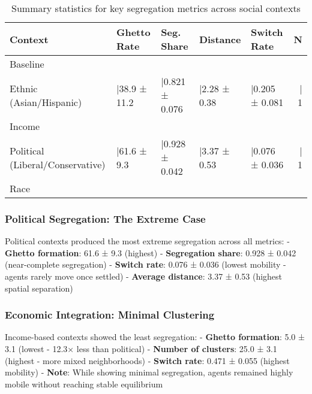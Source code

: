\documentclass[
  11pt,
]{article}
\begin{document}
\begin{longtable}[t]{lllllr}
\caption{Summary statistics for key segregation metrics across social contexts}\tabularnewline

\toprule
Context & Ghetto Rate & Seg. Share & Distance & Switch Rate & N\\
\midrule
Baseline
\cellcolor{gray!10}{(Red/Blue)} & \cellcolor{gray!10}{|19.5 ± 9.6} & \cellcolor{gray!10}{|0.679 ± 0.072} & \cellcolor{gray!10}{|1.59 ± 0.28} & \cellcolor{gray!10}{|0.363 ± 0.078} & \cellcolor{gray!10}{| 10}\\
Ethnic
(Asian/Hispanic) & |38.9 ± 11.2 & |0.821 ± 0.076 & |2.28 ± 0.38 & |0.205 ± 0.081 & |  1\\
Income
\cellcolor{gray!10}{(High/Low)} & \cellcolor{gray!10}{|5.0 ± 3.1} & \cellcolor{gray!10}{|0.543 ± 0.034} & \cellcolor{gray!10}{|1.24 ± 0.08} & \cellcolor{gray!10}{|0.471 ± 0.055} & \cellcolor{gray!10}{|  1}\\
Political
(Liberal/Conservative) & |61.6 ± 9.3 & |0.928 ± 0.042 & |3.37 ± 0.53 & |0.076 ± 0.036 & |  1\\
Race
\cellcolor{gray!10}{(White/Black)} & \cellcolor{gray!10}{|40.8 ± 9.6} & \cellcolor{gray!10}{|0.823 ± 0.060} & \cellcolor{gray!10}{|2.39 ± 0.43} & \cellcolor{gray!10}{|0.194 ± 0.064} & \cellcolor{gray!10}{|  1}\\
\bottomrule
\end{longtable}

\subsubsection{Political Segregation: The Extreme
Case}\label{political-segregation-the-extreme-case}

Political contexts produced the most extreme segregation across all
metrics: - \textbf{Ghetto formation}: 61.6 ± 9.3 (highest) -
\textbf{Segregation share}: 0.928 ± 0.042 (near-complete segregation) -
\textbf{Switch rate}: 0.076 ± 0.036 (lowest mobility - agents rarely
move once settled) - \textbf{Average distance}: 3.37 ± 0.53 (highest
spatial separation)

\subsubsection{Economic Integration: Minimal
Clustering}\label{economic-integration-minimal-clustering}

Income-based contexts showed the least segregation: - \textbf{Ghetto
formation}: 5.0 ± 3.1 (lowest - 12.3× less than political) -
\textbf{Number of clusters}: 25.0 ± 3.1 (highest - more mixed
neighborhoods) - \textbf{Switch rate}: 0.471 ± 0.055 (highest mobility)
- \textbf{Note}: While showing minimal segregation, agents remained
highly mobile without reaching stable equilibrium
\end{document}
